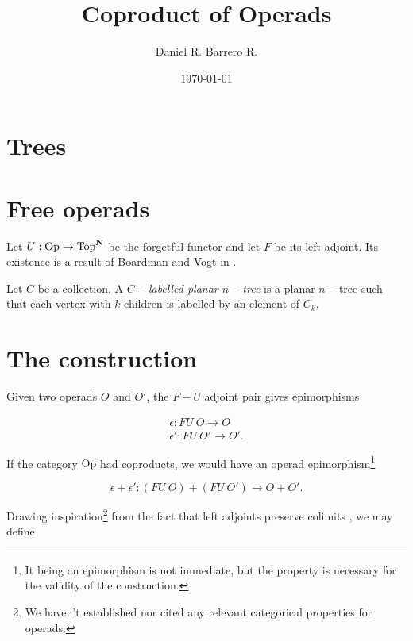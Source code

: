\documentclass{amsart}
\title{Coproduct of Operads}
\author{Daniel R. Barrero R.}
\date{\today}
\begin{document}

\maketitle

\section{Trees}



\section{Free operads}

Let $U : \mathrm{Op} \to \mathrm{Top}^{\mathbf{N}}$ be the forgetful functor and
let $F$ be its left adjoint. Its existence is a result of Boardman and Vogt
in \cite{bv-hiasots}.

\begin{defn}
	Let $C$ be a collection. A \emph{$C-$labelled planar $n-$tree} is a
	planar $n-$tree such that each vertex with $k$ children is labelled
	by an element of $C_k$.
\end{defn}


	

\section{The construction}

Given two operads $O$ and $O'$, the $F-U$ adjoint pair gives epimorphisms 

\begin{eqnarray}\label{fu-epis}
	\epsilon : FU \ O \to O \\
	\epsilon' : FU \ O' \to O'.
\end{eqnarray}

If the category $\mathrm{Op}$ had coproducts, we would have an operad
epimorphism\footnote{It being an epimorphism is not immediate, but the
property is necessary for the validity of the construction.}

\begin{equation}\label{cpd-epis}
	\epsilon + \epsilon' : (FU \ O) + (FU \ O') \to O + O'.
\end{equation}

Drawing inspiration\footnote{We haven't established nor cited any relevant
categorical properties for operads.} from the fact that left adjoints
preserve colimits \cite{riehl-ctic}, we may define
\end{document}
